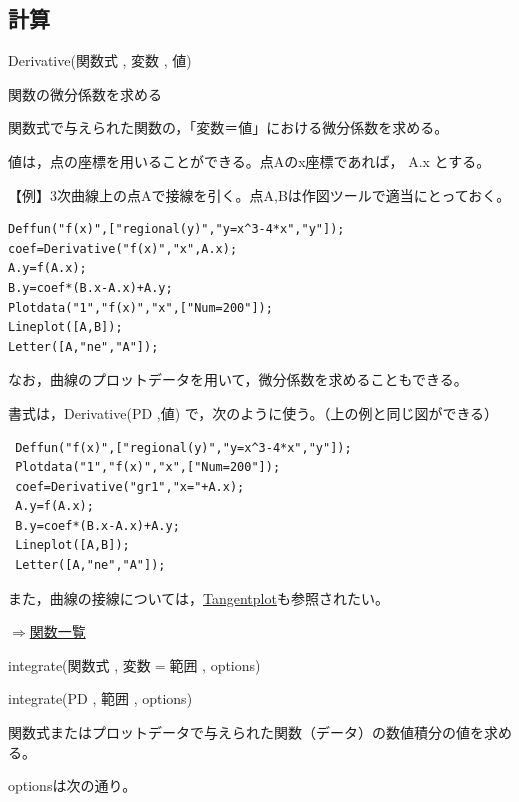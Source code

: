 \documentclass[papersize,a4paper,12pt,uplatex]{jsarticle}
\begin{document}
\subsection{計算}

\begin{description}

\hypertarget{derivative}{}
\item[関数]Derivative(関数式 , 変数 , 値)
\item[機能]関数の微分係数を求める
\item[説明]関数式で与えられた関数の，「変数＝値」における微分係数を求める。

値は，点の座標を用いることができる。点Aのx座標であれば， A.x とする。

\vspace{\baselineskip}
【例】3次曲線上の点Aで接線を引く。点A,Bは作図ツールで適当にとっておく。
\begin{verbatim}
Deffun("f(x)",["regional(y)","y=x^3-4*x","y"]);
coef=Derivative("f(x)","x",A.x);
A.y=f(A.x);
B.y=coef*(B.x-A.x)+A.y;
Plotdata("1","f(x)","x",["Num=200"]);
Lineplot([A,B]);
Letter([A,"ne","A"]);
\end{verbatim}
\begin{center}  \end{center}


なお，曲線のプロットデータを用いて，微分係数を求めることもできる。

書式は，Derivative(PD ,値) で，次のように使う。（上の例と同じ図ができる）

\begin{verbatim}
 Deffun("f(x)",["regional(y)","y=x^3-4*x","y"]);
 Plotdata("1","f(x)","x",["Num=200"]);
 coef=Derivative("gr1","x="+A.x);
 A.y=f(A.x);
 B.y=coef*(B.x-A.x)+A.y;
 Lineplot([A,B]);
 Letter([A,"ne","A"]);
\end{verbatim}

また，曲線の接線については，\hyperlink{tangentplot}{Tangentplot}も参照されたい。

\begin{flushright}\hyperlink{functionlist}{$\Rightarrow$関数一覧}\end{flushright}

\vspace{\baselineskip}
\hypertarget{integrate}{}
\item[関数]integrate(関数式 , 変数$=$範囲 , options)
\item[関数]integrate(PD , 範囲 , options)
\item[機能]関数式またはプロットデータで与えられた関数（データ）の数値積分の値を求める。
\item[説明]optionsは次の通り。


\end{description}
\end{document}
